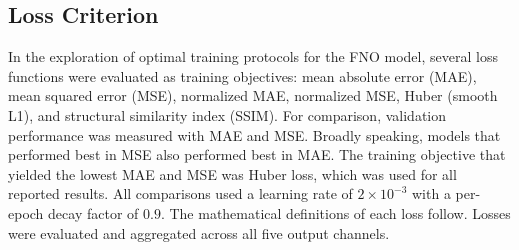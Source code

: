 \documentclass[preprint,review,12pt,numafflabel]{elsarticle}
\begin{document}
\subsection{Loss Criterion}
In the exploration of optimal training protocols for the FNO model, several loss functions were evaluated as training objectives: mean absolute error (MAE), mean squared error (MSE), normalized MAE, normalized MSE, Huber (smooth L1), and structural similarity index (SSIM). For comparison, validation performance was measured with MAE and MSE. Broadly speaking, models that performed best in MSE also performed best in MAE. The training objective that yielded the lowest MAE and MSE was Huber loss, which was used for all reported results. All comparisons used a learning rate of $2\times10^{-3}$ with a per-epoch decay factor of $0.9$. The mathematical definitions of each loss follow. Losses were evaluated and aggregated across all five output channels. 
\end{document}

